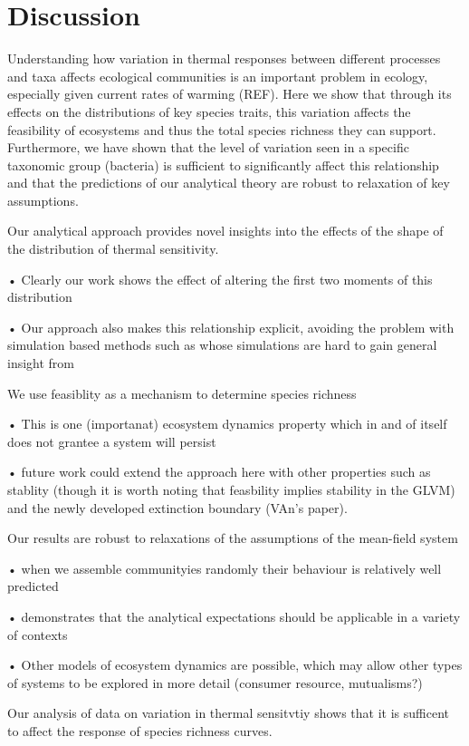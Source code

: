 \documentclass{article}
\begin{document}
\section*{Discussion}

Understanding how variation in thermal responses between different processes and taxa affects ecological communities is an important problem in ecology, especially given current rates of warming (REF). Here we show that through its effects on the distributions of key species traits, this variation affects the feasibility of ecosystems and thus the total species richness they can support. Furthermore, we have shown that the level of variation seen in a specific taxonomic group (bacteria) is sufficient to significantly affect this relationship and that the predictions of our analytical theory are robust to relaxation of key assumptions. 

Our analytical approach provides novel insights into the effects of the shape of the distribution of thermal sensitivity.  
    
    • Clearly our work shows the effect of altering the first two moments of this distribution
    
    • Our approach also makes this relationship explicit, avoiding the problem with simulation based methods such as \citet{Stegen2012} whose simulations are hard to gain general insight from

We use feasiblity as a mechanism to determine species richness 
    
    • This is one (importanat) ecosystem dynamics property which in and of itself does not grantee a system will persist
    
    • future work could extend the approach here with other properties such as stablity (though it is worth noting that feasbility implies stability in the GLVM) and the newly developed extinction boundary (VAn's paper). 
    
Our results are robust to relaxations of the assumptions of the mean-field system
   
    • when we assemble communityies randomly their behaviour is  relatively well predicted
    
    • demonstrates that the analytical expectations should be applicable in a variety of contexts
    
    • Other models of ecosystem dynamics are possible, which may allow other types of systems to be explored in more detail (consumer resource, mutualisms?)

Our analysis of data on variation in thermal sensitvtiy shows that it is sufficent to affect the response of species richness curves.
    
\end{document}

